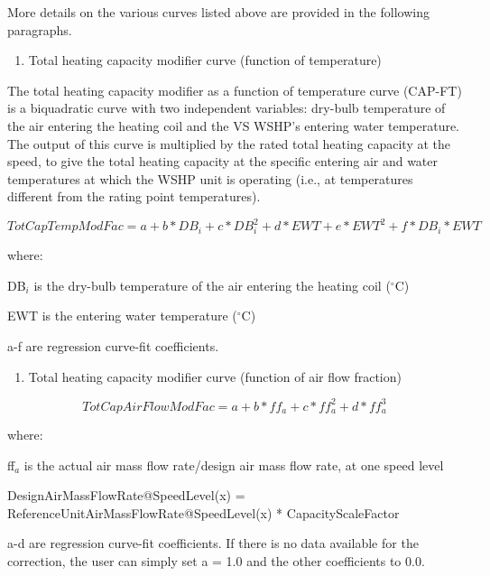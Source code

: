 More details on the various curves listed above are provided in the following paragraphs.

\begin{enumerate}
\def\labelenumi{\arabic{enumi})}
\item Total heating capacity modifier curve (function of temperature)
\end{enumerate}

The total heating capacity modifier as a function of temperature curve (CAP-FT) is a biquadratic curve with two independent variables: dry-bulb temperature of the air entering the heating coil and the VS WSHP's entering water temperature. The output of this curve is multiplied by the rated total heating capacity at the speed, to give the total heating capacity at the specific entering air and water temperatures at which the WSHP unit is operating (i.e., at temperatures different from the rating point temperatures).

\begin{equation}
TotCapTempModFac = a + b*D{B_i} + c*DB_i^2 + d*EWT + e*EW{T^2} + f*D{B_i}*EWT
\end{equation}

where:

DB\(_{i}\) is the dry-bulb temperature of the air entering the heating coil (\(^{\circ}\)C)

EWT is the entering water temperature (\(^{\circ}\)C)

a-f are regression curve-fit coefficients.

\begin{enumerate}
\def\labelenumi{\arabic{enumi})}
\setcounter{enumi}{1}
\tightlist
\item
  Total heating capacity modifier curve (function of air flow fraction)
\end{enumerate}

\begin{equation}
TotCapAirFlowModFac = a + b*f{f_a} + c*ff_a^2 + d*ff_a^3
\end{equation}

where:

ff\(_{a}\) is the actual air mass flow rate/design air mass flow rate, at one speed level

DesignAirMassFlowRate@SpeedLevel(x) = ReferenceUnitAirMassFlowRate@SpeedLevel(x) * CapacityScaleFactor

a-d are regression curve-fit coefficients.  If there is no data available for the correction, the user can simply set a = 1.0 and the other coefficients to 0.0.


